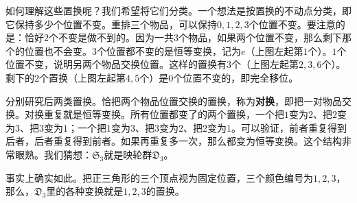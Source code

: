 \documentclass[12pt,UTF8,fontset=none]{ctexbook}
\begin{document}
如何理解这些置换呢？我们希望将它们分类。一个想法是按置换的不动点分类，即它保持多少个位置不变。重排三个物品，可以保持$0,1,2,3$个位置不变。要注意的是：恰好$2$个不变是做不到的。因为一共$3$个物品，如果两个位置不变，那么剩下那个的位置也不会变。$3$个位置都不变的是恒等变换，记为$e$（上图左起第$1$个）。$1$个位置不变，说明另两个物品交换位置。这样的置换有$3$个（上图左起第$2,3,6$个）。剩下的$2$个置换（上图左起第$4,5$个）是$0$个位置不变的，即完全移位。

分别研究后两类置换。恰把两个物品位置交换的置换，称为\textbf{对换}，即把一对物品交换。对换重复就是恒等变换。所有位置都变了的两个置换，一个把$1$变为$2$、把$2$变为$3$、把$3$变为$1$；一个把$1$变为$3$、把$3$变为$2$、把$2$变为$1$。可以验证，前者重复得到后者，后者重复得到前者。如果再重复多一次，那么都变为恒等变换。这个结构非常眼熟。我们猜想：$\mathfrak{S}_3$就是映轮群$\mathfrak{D}_3$。

事实上确实如此。把正三角形的三个顶点视为固定位置，三个颜色编号为$1,2,3$，那么，$\mathfrak{D}_3$里的各种变换就是$1,2,3$的置换。
\end{document}
